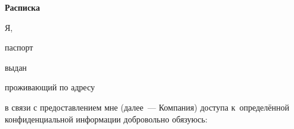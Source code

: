 \documentclass[12pt,a4paper]{extarticle}
\begin{document}
\pagestyle{empty}
\sloppy
\setlength{\parindent}{0pt}
\setlength{\parskip}{6pt}

\begin{center}
  \textbf{\large Расписка}
\end{center}

\vspace{0.5em}

Я, \hseAuthorName~\hrulefill

\vspace{0.3em}
паспорт \hrulefill

\vspace{0.3em}
выдан \hrulefill

\vspace{0.3em}
проживающий по адресу \hrulefill

\hrulefill

\vspace{0.5em}
в связи с предоставлением мне \underline{\hspace{5cm}} (далее~--- Компания)
доступа к~определённой конфиденциальной информации добровольно обязуюсь:
\end{document}
